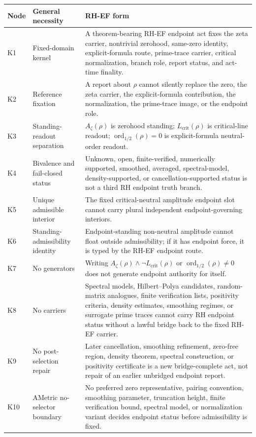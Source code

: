 \documentclass[11pt]{article}
\newcommand{\Az}{A_{\zeta}}
\newcommand{\Lcrit}{L_{\mathrm{crit}}}
\newcommand{\ordhalf}{\operatorname{ord}_{1/2}}
\begin{document}
\begin{longtable}{L{0.13\textwidth}L{0.25\textwidth}L{0.52\textwidth}}
\toprule
\textbf{Node} & \textbf{General necessity} & \textbf{RH-EF form}\\
\midrule
K1 & Fixed-domain kernel & A theorem-bearing RH-EF endpoint act fixes the zeta carrier, nontrivial zerohood, same-zero identity, explicit-formula route, prime-trace carrier, critical normalization, branch role, report status, and act-time finality.\\
K2 & Reference fixation & A report about \(\rho\) cannot silently replace the zero, the zeta carrier, the explicit-formula contribution, the normalization, the prime-trace image, or the endpoint role.\\
K3 & Standing-readout separation & \(\Az(\rho)\) is zerohood standing; \(\Lcrit(\rho)\) is critical-line readout; \(\ordhalf(\rho)=0\) is explicit-formula neutral-order readout.\\
K4 & Bivalence and fail-closed status & Unknown, open, finite-verified, numerically supported, smoothed, averaged, spectral-model, density-supported, or cancellation-supported status is not a third RH endpoint truth branch.\\
K5 & Unique admissible interior & The fixed critical-neutral amplitude endpoint slot cannot carry plural independent endpoint-governing interiors.\\
K6 & Standing-admissibility identity & Endpoint-standing non-neutral amplitude cannot float outside admissibility; if it has endpoint force, it is typed by the RH-EF endpoint route.\\
K7 & No generators & Writing \(\Az(\rho)\wedge\neg\Lcrit(\rho)\) or \(\ordhalf(\rho)\ne0\) does not generate endpoint authority for itself.\\
K8 & No carriers & Spectral models, Hilbert--Polya candidates, random-matrix analogues, finite verification lists, positivity criteria, density estimates, smoothing regimes, or surrogate prime traces cannot carry RH endpoint status without a lawful bridge back to the fixed RH-EF carrier.\\
K9 & No post-selection repair & Later cancellation, smoothing refinement, zero-free region, density theorem, spectral construction, or positivity certificate is a new bridge-complete act, not repair of an earlier unbridged endpoint report.\\
K10 & AMetric no-selector boundary & No preferred zero representative, pairing convention, smoothing parameter, truncation height, finite verification bound, spectral model, or normalization variant decides endpoint status before admissibility is fixed.\\

\end{longtable}
\end{document}
